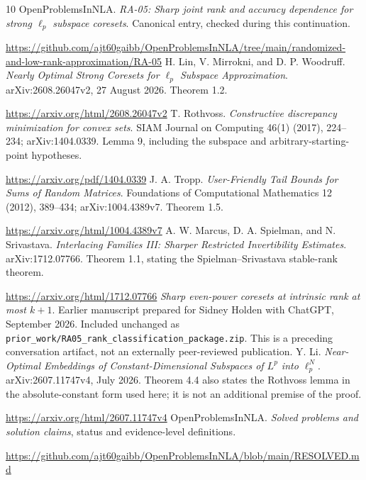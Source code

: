 \documentclass[11pt]{article}
\theoremstyle{remark}\newtheorem{remark}[theorem]{Remark}
\numberwithin{equation}{section}
\begin{document}
\begin{thebibliography}{10}
 OpenProblemsInNLA. \emph{RA-05: Sharp joint rank and accuracy dependence for strong $\ell_p$ subspace coresets}. Canonical entry, checked during this continuation.\par
\url{https://github.com/ajt60gaibb/OpenProblemsInNLA/tree/main/randomized-and-low-rank-approximation/RA-05}
 H. Lin, V. Mirrokni, and D. P. Woodruff. \emph{Nearly Optimal Strong Coresets for $\ell_p$ Subspace Approximation}. arXiv:2608.26047v2, 27 August 2026. Theorem 1.2.\par
\url{https://arxiv.org/html/2608.26047v2}
 T. Rothvoss. \emph{Constructive discrepancy minimization for convex sets}. SIAM Journal on Computing 46(1) (2017), 224--234; arXiv:1404.0339. Lemma 9, including the subspace and arbitrary-starting-point hypotheses.\par
\url{https://arxiv.org/pdf/1404.0339}
 J. A. Tropp. \emph{User-Friendly Tail Bounds for Sums of Random Matrices}. Foundations of Computational Mathematics 12 (2012), 389--434; arXiv:1004.4389v7. Theorem 1.5.\par
\url{https://arxiv.org/html/1004.4389v7}
 A. W. Marcus, D. A. Spielman, and N. Srivastava. \emph{Interlacing Families III: Sharper Restricted Invertibility Estimates}. arXiv:1712.07766. Theorem 1.1, stating the Spielman--Srivastava stable-rank theorem.\par
\url{https://arxiv.org/html/1712.07766}
 \emph{Sharp even-power coresets at intrinsic rank at most $k+1$}. Earlier manuscript prepared for Sidney Holden with ChatGPT, September 2026. Included unchanged as \texttt{prior\_work/RA05\_rank\_classification\_package.zip}. This is a preceding conversation artifact, not an externally peer-reviewed publication.
 Y. Li. \emph{Near-Optimal Embeddings of Constant-Dimensional Subspaces of $L^p$ into $\ell_p^N$}. arXiv:2607.11747v4, July 2026. Theorem 4.4 also states the Rothvoss lemma in the absolute-constant form used here; it is not an additional premise of the proof.\par
\url{https://arxiv.org/html/2607.11747v4}
 OpenProblemsInNLA. \emph{Solved problems and solution claims}, status and evidence-level definitions.\par
\url{https://github.com/ajt60gaibb/OpenProblemsInNLA/blob/main/RESOLVED.md}
\end{thebibliography}
\end{document}
